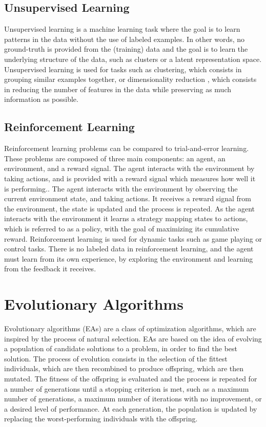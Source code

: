 \subsection{Unsupervised Learning}

Unsupervised learning \cite{unsupervised_learning} is a machine learning task where the goal is to learn patterns in the data without the use of labeled examples.
In other words, no ground-truth is provided from the (training) data and the goal is to learn the underlying structure of the data, such as clusters or a latent
representation space. Unsupervised learning is used for tasks such as clustering, which consists in grouping similar examples together, or dimensionality reduction
\cite{dimensionality_review,dimensionality_survey}, which consists in reducing the number of features in the data while preserving as much information as possible.

\subsection{Reinforcement Learning}

Reinforcement learning problems \cite{rl_survey} can be compared to trial-and-error learning. These problems are composed of three main components: an agent, an environment, and a reward
signal. The agent interacts with the environment by taking actions, and is provided with a reward signal which measures how well it is performing.. The agent interacts with
the environment by observing the current environment state, and taking actions. It receives a reward signal from the environment, the state is updated and the process is repeated.
As the agent interacts with the environment it learns a strategy mapping states to actions, which is referred to as a policy, with the goal of maximizing its cumulative reward.
Reinforcement learning is used for dynamic tasks such as game playing or control tasks.
There is no labeled data in reinforcement learning, and the agent must learn from its own experience, by exploring the environment and learning from the feedback it receives.

\section{Evolutionary Algorithms}

Evolutionary algorithms (EAs) are a class of optimization algorithms, which are inspired by the process of natural selection. EAs are based on the idea of
evolving a population of candidate solutions to a problem, in order to find the best solution. The process of evolution consists in the selection of the
fittest individuals, which are then recombined to produce offspring, which are then mutated. The fitness of the offspring is evaluated and the process is
repeated for a number of generations until a stopping criterion is met, such as a maximum number of generations, a maximum number of iterations with no improvement,
or a desired level of performance. At each generation, the population is updated by replacing the worst-performing individuals with the offspring.

